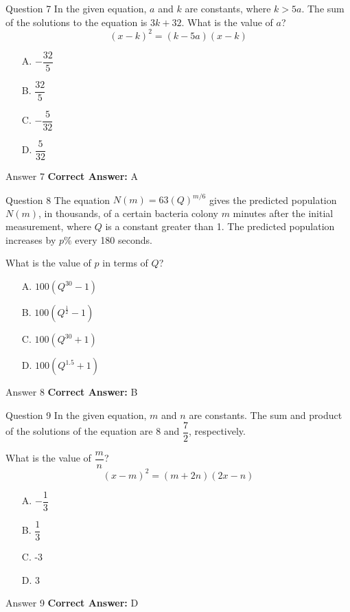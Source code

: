 \documentclass{beamer}
\begin{document}
\begin{frame}{Question 7}
\small
In the given equation, \(a\) and \(k\) are constants, where \(k > 5a\). The sum of the solutions to the equation is \(3k + 32\). What is the value of \(a\)?
\[
(x - k)^2 = (k - 5a)(x - k)
\]
\vspace{0.35cm}
\begin{enumerate}
    \item[A.] \(-\dfrac{32}{5}\)
    \item[B.] \(\dfrac{32}{5}\)
    \item[C.] \(-\dfrac{5}{32}\)
    \item[D.] \(\dfrac{5}{32}\)
\end{enumerate}
\end{frame}
\begin{frame}{Answer 7}
\small
\textbf{Correct Answer:} A
\end{frame}

\begin{frame}{Question 8}
\small
The equation \(N(m) = 63(Q)^{m/6}\) gives the predicted population \(N(m)\), in thousands, of a certain bacteria colony \(m\) minutes after the initial measurement, where \(Q\) is a constant greater than 1. The predicted population increases by \(p\%\) every 180 seconds.

What is the value of \(p\) in terms of \(Q\)?
\vspace{0.35cm}
\begin{enumerate}
    \item[A.] \(100(Q^{30} - 1)\)
    \item[B.] \(100(Q^{\frac{1}{2}} - 1)\)
    \item[C.] \(100(Q^{30} + 1)\)
    \item[D.] \(100(Q^{1.5} + 1)\)
\end{enumerate}
\end{frame}
\begin{frame}{Answer 8}
\small
\textbf{Correct Answer:} B
\end{frame}

\begin{frame}{Question 9}
\small
In the given equation, \(m\) and \(n\) are constants. The sum and product of the solutions of the equation are 8 and \(\dfrac{7}{2}\), respectively.

What is the value of \(\dfrac{m}{n}\)?
\[
(x - m)^2 = (m + 2n)(2x - n)
\]
\vspace{0.35cm}
\begin{enumerate}
    \item[A.] \(-\dfrac{1}{3}\)
    \item[B.] \(\dfrac{1}{3}\)
    \item[C.] -3
    \item[D.] 3
\end{enumerate}
\end{frame}
\begin{frame}{Answer 9}
\small
\textbf{Correct Answer:} D
\end{frame}
\end{document}
